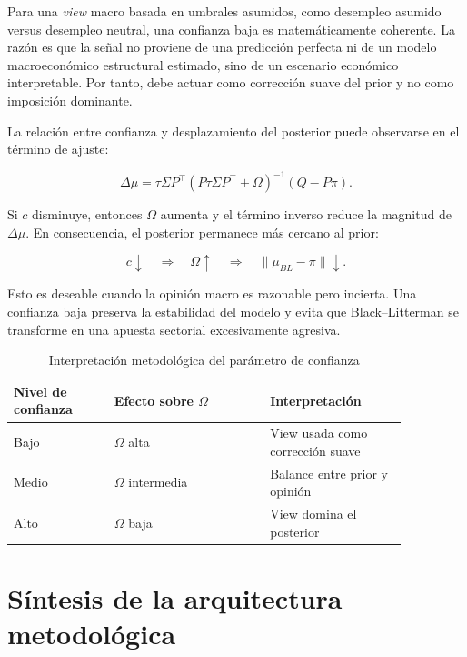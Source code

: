 \documentclass[11pt]{article}
\begin{document}
Para una \textit{view} macro basada en umbrales asumidos, como desempleo asumido versus desempleo neutral, una confianza baja es matem\'aticamente coherente. La raz\'on es que la se\~nal no proviene de una predicci\'on perfecta ni de un modelo macroecon\'omico estructural estimado, sino de un escenario econ\'omico interpretable. Por tanto, debe actuar como correcci\'on suave del prior y no como imposici\'on dominante.

La relaci\'on entre confianza y desplazamiento del posterior puede observarse en el t\'ermino de ajuste:

\begin{equation}
    \Delta \mu
    =
    \tau \Sigma P^\top
    \left(
    P\tau\Sigma P^\top + \Omega
    \right)^{-1}
    (Q-P\pi).
\end{equation}

Si $c$ disminuye, entonces $\Omega$ aumenta y el t\'ermino inverso reduce la magnitud de $\Delta \mu$. En consecuencia, el posterior permanece m\'as cercano al prior:

\begin{equation}
    c \downarrow
    \quad \Rightarrow \quad
    \Omega \uparrow
    \quad \Rightarrow \quad
    \|\mu_{BL} - \pi\| \downarrow.
\end{equation}

Esto es deseable cuando la opini\'on macro es razonable pero incierta. Una confianza baja preserva la estabilidad del modelo y evita que Black--Litterman se transforme en una apuesta sectorial excesivamente agresiva.

\begin{table}[H]
\centering
\caption{Interpretaci\'on metodol\'ogica del par\'ametro de confianza}
\begin{tabular}{p{0.22\linewidth} p{0.34\linewidth} p{0.30\linewidth}}
\toprule
Nivel de confianza & Efecto sobre $\Omega$ & Interpretaci\'on \\
\midrule
Bajo & $\Omega$ alta & View usada como correcci\'on suave \\
Medio & $\Omega$ intermedia & Balance entre prior y opini\'on \\
Alto & $\Omega$ baja & View domina el posterior \\
\bottomrule
\end{tabular}
\end{table}

\section{S\'intesis de la arquitectura metodol\'ogica}
\end{document}
